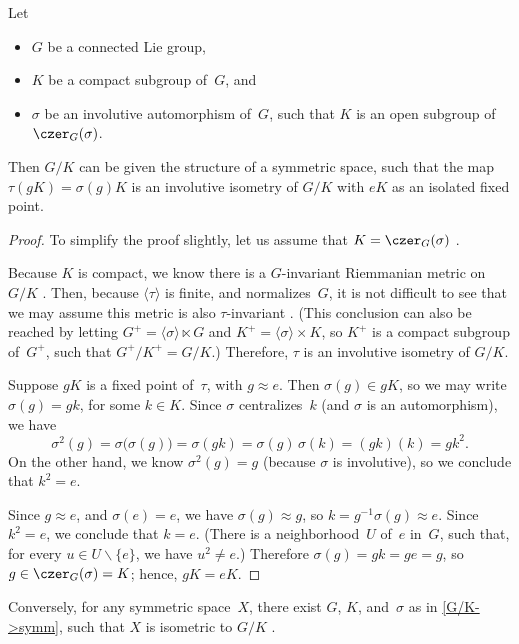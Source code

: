 \begin{prop} \label{G/K->symm}
 Let
 \begin{itemize}
 \item $G$ be a connected Lie group,
 \item $K$ be a compact subgroup of~$G$, and
 \item $\sigma$ be an involutive automorphism of~$G$, such that $K$
is an open subgroup of $\czer_G(\sigma)$.
 \end{itemize}
 Then $G/K$ can be given the structure of a symmetric space, such that
the map $\tau(gK) = \sigma(g) K$ is an involutive isometry of $G/K$
with $eK$ as an isolated fixed point.
 \end{prop}

\begin{proof}
 To simplify the proof slightly, let us assume that $K = \czer_G(\sigma)$
. 

Because $K$ is compact, we know there is a $G$-invariant Riemmanian
metric on $G/K$ . Then, because $\langle \tau
\rangle$ is finite, and normalizes~$G$, it is not difficult to see
that we may assume this metric is also $\tau$-invariant
. (This conclusion can also be reached by
letting $G^+ = \langle \sigma \rangle \ltimes G$ and $K^+ = \langle
\sigma \rangle \times K$, so $K^+$ is a compact subgroup of~$G^+$,
such that $G^+/K^+ = G/K$.) Therefore, $\tau$ is an involutive isometry of
$G/K$.

Suppose $gK$ is a fixed point of~$\tau$, with $g \approx e$. Then
$\sigma(g) \in g K$, so we may write $\sigma(g) = gk$, for some $k
\in K$. Since $\sigma$ centralizes~$k$ (and $\sigma$ is an
automorphism), we have
 $$\sigma^2(g) = \sigma \bigl( \sigma(g) \bigr)
 = \sigma(gk) = \sigma(g) \, \sigma(k) 
 = (gk) (k)= g k^2 .$$
 On the other hand, we know $\sigma^2(g) = g$ (because $\sigma$ is
involutive), so we conclude that $k^2 = e$.

Since $g \approx e$, and $\sigma(e) = e$, we have $\sigma(g) \approx
g$, so $k = g^{-1} \sigma(g) \approx e$. Since $k^2 = e$, we conclude
that $k = e$. (There is a neighborhood~$U$ of~$e$ in~$G$, such that,
for every $u \in U \smallsetminus \{e\}$, we have $u^2 \neq e$.) 
Therefore $\sigma(g) = gk = ge = g$, so $g \in \czer_G(\sigma) = K$;
hence, $gK = eK$.
 \end{proof}

Conversely, for any symmetric space~$X$, there exist $G$, $K$,
and~$\sigma$ as in \cref{G/K->symm}, such that $X$ is
isometric to $G/K$ . 

